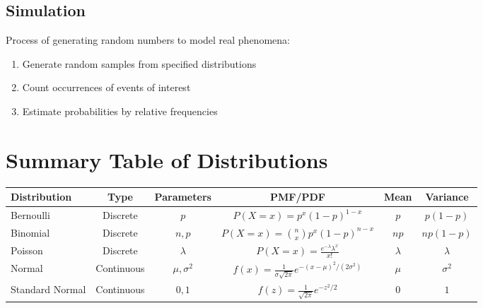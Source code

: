 \documentclass[11pt]{article}
\begin{document}
\subsection*{Simulation}
Process of generating random numbers to model real phenomena:
\begin{enumerate}[nosep]
    \item Generate random samples from specified distributions
    \item Count occurrences of events of interest
    \item Estimate probabilities by relative frequencies
\end{enumerate}

\section*{Summary Table of Distributions}
{\small
\begin{center}
\begin{tabular}{l c c c c c}
\toprule
\textbf{Distribution} & \textbf{Type} & \textbf{Parameters} & \textbf{PMF/PDF} & \textbf{Mean} & \textbf{Variance} \\
\midrule
Bernoulli & Discrete & \(p\) & \(P(X=x)=p^x(1-p)^{1-x}\) & \(p\) & \(p(1-p)\) \\
Binomial & Discrete & \(n,p\) & \(P(X=x)=\binom{n}{x}p^x(1-p)^{n-x}\) & \(np\) & \(np(1-p)\) \\
Poisson & Discrete & \(\lambda\) & \(P(X=x)=\frac{e^{-\lambda}\lambda^x}{x!}\) & \(\lambda\) & \(\lambda\) \\
Normal & Continuous & \(\mu,\sigma^2\) & \(f(x)=\frac{1}{\sigma\sqrt{2\pi}}e^{-(x-\mu)^2/(2\sigma^2)}\) & \(\mu\) & \(\sigma^2\) \\
Standard Normal & Continuous & \(0,1\) & \(f(z)=\frac{1}{\sqrt{2\pi}}e^{-z^2/2}\) & \(0\) & \(1\) \\
\bottomrule
\end{tabular}
\end{center}
}

\end{document}
